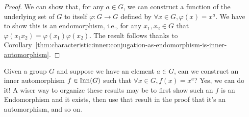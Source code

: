 \begin{proof}
We can show that, for any $a\in G$, we can construct a function of the
underlying set of $G$ to itself $\varphi\colon G\to G$ defined by
$\forall x\in G, \varphi(x)=x^{a}$. We have to show this is an
endomorphism, i.e., for any $x_{1},x_{2}\in G$ that
$\varphi(x_{1}x_{2})=\varphi(x_{1})\varphi(x_{2})$. The result follows
thanks to Corollary~\ref{thm:characteristic:inner:conjugation-as-endomorphism-is-inner-automorphism}.
\end{proof}

\begin{thm-remark}[Motivation]
Given a group $G$ and suppose we have an element $a\in G$, can we
construct an inner automorphism $f\in\operatorname{Inn}(G)$ such that
$\forall x\in G, f(x) = x^{a}$? Yes, we can do it!
A wiser way to organize these results may be to first show such an $f$
is an Endomorphism and it exists, then use that result in the proof that
it's an automorphism, and so on.
\end{thm-remark}

